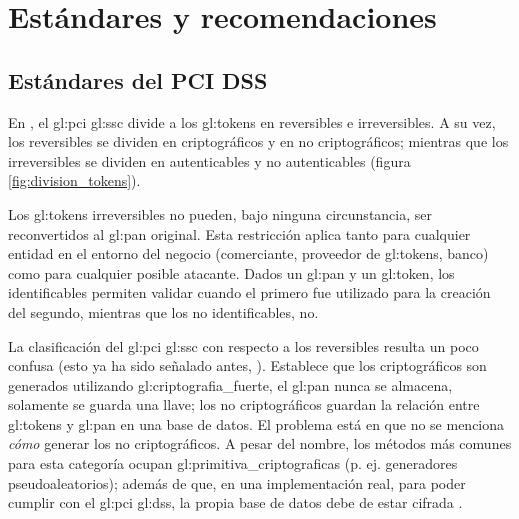 %
%

\section{Estándares y recomendaciones}
\label{sec:estandares}

\subsection{Estándares del PCI DSS}
\label{sec:pci_dss}

En \cite{pci_tokens}, el \gls{gl:pci} \gls{gl:ssc} divide a los
\glspl{gl:token} en reversibles e irreversibles. A su vez, los reversibles se
dividen en criptográficos y en no criptográficos; mientras que los
irreversibles se dividen en autenticables y no autenticables (figura
\ref{fig:division_tokens}).

Los \glspl{gl:token} irreversibles no pueden, bajo ninguna circunstancia, ser
reconvertidos al \gls{gl:pan} original. Esta restricción aplica tanto para
cualquier entidad en el entorno del negocio (comerciante, proveedor de
\glspl{gl:token}, banco) como para cualquier posible atacante. Dados un
\gls{gl:pan} y un \gls{gl:token}, los identificables permiten validar cuando el
primero fue utilizado para la creación del segundo, mientras que los no
identificables, no.



La clasificación del \gls{gl:pci} \gls{gl:ssc} con respecto a los reversibles
resulta un poco confusa (esto ya ha sido señalado antes, \cite{doc_sandra}).
Establece que los criptográficos son generados utilizando
\gls{gl:criptografia_fuerte}, el \gls{gl:pan} nunca se almacena, solamente se
guarda una llave; los no criptográficos guardan la relación entre
\glspl{gl:token} y \gls{gl:pan} en una base de datos. El problema está en que
no se menciona \textit{cómo} generar los no criptográficos. A pesar del nombre,
los métodos más comunes para esta categoría ocupan
\glspl{gl:primitiva_criptografica} (p. ej. generadores pseudoaleatorios); además
de que, en una implementación real, para poder cumplir con el \gls{gl:pci}
\gls{gl:dss}, la propia base de datos debe de estar cifrada \cite{pci_dss}.


